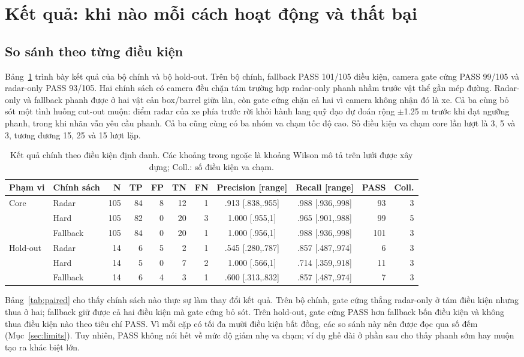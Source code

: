 \documentclass[conference]{IEEEtran}
\begin{document}
\section{Kết quả: khi nào mỗi cách hoạt động và thất bại}
\subsection{So sánh theo từng điều kiện}
Bảng~\ref{tab:primary} trình bày kết quả của bộ
chính và bộ hold-out. Trên bộ chính, fallback PASS 101/105 điều kiện, camera
gate cứng PASS 99/105 và radar-only PASS 93/105. Hai chính sách có camera đều
chặn tám trường hợp radar-only phanh nhầm trước vật thể gần mép đường. Radar-
only và fallback phanh được ở hai vật cản box/barrel giữa làn, còn gate cứng
chặn cả hai vì camera không nhận đó là xe. Cả ba cùng bỏ sót một tình huống
cut-out muộn: điểm radar của xe phía trước rời khỏi hành lang quỹ đạo dự đoán
rộng $\pm$1.25 m trước khi đạt ngưỡng phanh, trong khi nhãn vẫn yêu cầu phanh.
Cả ba cũng cùng có ba nhóm va chạm tốc độ cao. Số điều kiện va chạm core
lần lượt là 3, 5 và 3, tương đương 15, 25 và 15 lượt lặp.

\begin{table}[t]
\caption{Kết quả chính theo điều kiện định danh. Các khoảng trong ngoặc là khoảng Wilson mô tả trên lưới được xây dựng; Coll.: số điều kiện va chạm.}
\label{tab:primary}
\centering\scriptsize
\setlength{\tabcolsep}{3pt}
\begin{tabular}{llrrrrrccrr}
\toprule Phạm vi & Chính sách & N & TP & FP & TN & FN & Precision [range] & Recall [range] & PASS & Coll.\\
\midrule
Core & Radar & 105 & 84 & 8 & 12 & 1 & .913 [.838,.955] & .988 [.936,.998] & 93 & 3\\
 & Hard & 105 & 82 & 0 & 20 & 3 & 1.000 [.955,1] & .965 [.901,.988] & 99 & 5\\
 & Fallback & 105 & 84 & 0 & 20 & 1 & 1.000 [.956,1] & .988 [.936,.998] & 101 & 3\\
\midrule
Hold-out & Radar & 14 & 6 & 5 & 2 & 1 & .545 [.280,.787] & .857 [.487,.974] & 6 & 3\\
 & Hard & 14 & 5 & 0 & 7 & 2 & 1.000 [.566,1] & .714 [.359,.918] & 11 & 3\\
 & Fallback & 14 & 6 & 4 & 3 & 1 & .600 [.313,.832] & .857 [.487,.974] & 7 & 3\\
\bottomrule
\end{tabular}
\end{table}

Bảng~\ref{tab:paired} cho thấy chính sách nào thực sự làm thay đổi kết quả.
Trên bộ chính, gate cứng thắng radar-only ở tám điều kiện nhưng thua ở hai;
fallback giữ được cả hai điều kiện mà gate cứng bỏ sót. Trên hold-out, gate
cứng PASS hơn fallback bốn điều kiện và không thua điều kiện nào theo tiêu chí
PASS. Vì mỗi cặp có tối đa mười điều kiện bất đồng, các so sánh này nên được
đọc qua số đếm (Mục~\ref{sec:limits}). Tuy nhiên, PASS không nói hết về mức độ giảm nhẹ va chạm; ví dụ ghế dài
ở phần sau cho thấy phanh sớm hay muộn tạo ra khác biệt lớn.
\end{document}
